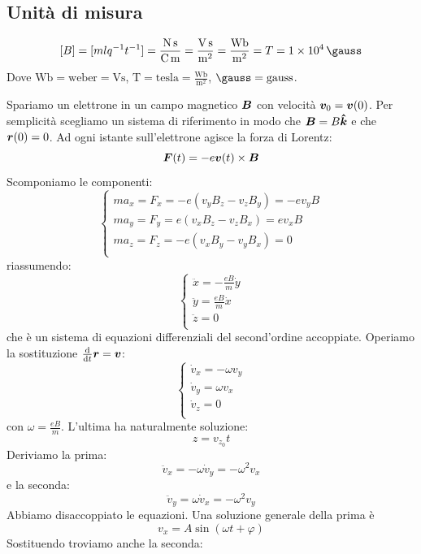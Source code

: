 \subsection{Unità di misura}
\[[B]=[mlq^{-1}t^{-1}]=\frac{\si{\newton\second}}{\si{\coulomb\meter}}=\frac{\si{\volt\second}}{\si{\meter\squared}}=\frac{\si{\weber}}{\si{\metre\squared}}=T=\SI{1E4}{\gauss}\]
Dove $\si{\weber}=\text{weber}=\si{\volt\second}$, $\si{\tesla}=\text{tesla}=\frac{\si{\weber}}{\si{\meter\squared}}$, $\si{\gauss}=\text{gauss}$.
\begin{Es}
  \label{es_Larmor}
  Spariamo un elettrone in un campo magnetico $\boldsymbol{B}$ con velocità $\boldsymbol{v}_0=\boldsymbol{v}(0)$. Per semplicità scegliamo un sistema di riferimento in modo che $\boldsymbol{B}=B\boldsymbol{\hat {k}}$ e che $\boldsymbol{r}(0)=0$. Ad ogni istante sull'elettrone agisce la forza di Lorentz:
  \[\boldsymbol{F}(t)=-e\boldsymbol{v}(t)\times \boldsymbol{B}\]
  Scomponiamo le componenti:
  \[\left\{
    \begin{array}{l}
      ma_x=F_x=-e\left(v_yB_z-v_zB_y\right)=-ev_yB \\
      ma_y=F_y=e\left(v_xB_z-v_zB_x\right)=ev_xB   \\
      ma_z=F_z=-e\left(v_xB_y-v_yB_x\right)=0      \\
    \end{array}\right.\]
  riassumendo:
  \[\left\{
    \begin{array}{l}
      \ddot x=-\frac{eB}{m}\dot y \\
      \ddot y=\frac{eB}{m}\dot x  \\
      \ddot z=0                   \\
    \end{array}\right.\]
  che è un sistema di equazioni differenziali del second'ordine accoppiate. Operiamo la sostituzione $\frac{\mathrm{d}}{\mathrm{d} t}\boldsymbol{r}=\boldsymbol{v}$:
  \[
    \left\{
    \begin{array}{l}
      \dot v_x=-\omega v_y \\
      \dot v_y=\omega v_x  \\
      \dot v_z=0           \\
    \end{array}\right.\]
  con $\omega=\frac{eB}{m}$. L'ultima ha naturalmente soluzione:
  \[z=v_{z_0}t\]
  Deriviamo la prima:
  \[\ddot v_x=-\omega\dot v_y=-\omega^2 v_x\]
  e la seconda:
  \[\ddot v_y=\omega\dot v_x=-\omega^2 v_y\]
  Abbiamo disaccoppiato le equazioni. Una soluzione generale della prima è
  \[v_x=A\sin\left(\omega t+\varphi\right)\]
  Sostituendo troviamo anche la seconda:

\end{Es}
